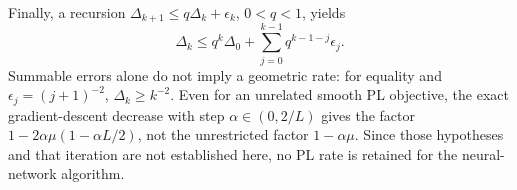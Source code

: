 Finally, a recursion $\Delta_{k+1}\le q\Delta_k+\epsilon_k$, $0<q<1$, yields
\[
 \Delta_k\le q^k\Delta_0+\sum_{j=0}^{k-1}q^{k-1-j}\epsilon_j.
\]
Summable errors alone do not imply a geometric rate: for equality and $\epsilon_j=(j+1)^{-2}$, $\Delta_k\ge k^{-2}$. Even for an unrelated smooth PL objective, the exact gradient-descent decrease with step $\alpha\in(0,2/L)$ gives the factor $1-2\alpha\mu(1-\alpha L/2)$, not the unrestricted factor $1-\alpha\mu$. Since those hypotheses and that iteration are not established here, no PL rate is retained for the neural-network algorithm.
